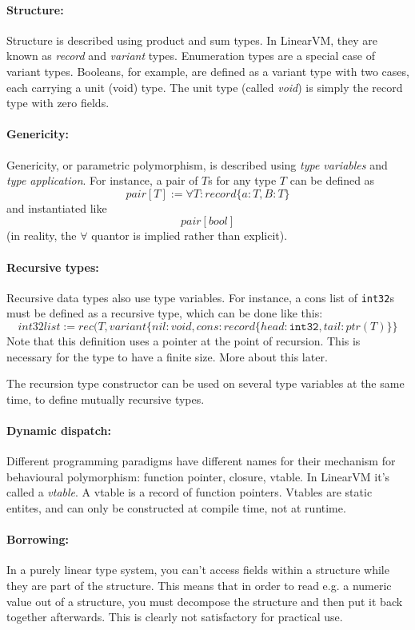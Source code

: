 \documentclass[a4paper]{report}
\begin{document}
\paragraph{Structure:}
Structure is described using product and sum types. In LinearVM, they
are known as \emph{record} and \emph{variant} types.
Enumeration types are a special case of variant types.
Booleans, for example, are defined as a variant type with two cases,
each carrying a unit (void) type.
The unit type (called \emph{void}) is simply the record type with zero fields.

\paragraph{Genericity:}
Genericity, or parametric polymorphism, is described using
\emph{type variables} and \emph{type application}.
For instance, a pair of $T$s for any type $T$ can be defined as
$$pair[T] := \forall T:record\{a:T, B:T\}$$
and instantiated like
$$pair[bool]$$
(in reality, the $\forall$ quantor is implied rather than explicit).

\paragraph{Recursive types:}
Recursive data types also use type variables.
For instance, a cons list of \texttt{int32}s must be defined as a recursive type,
which can be done like this:
$$
int32list := rec(T, variant\{nil:void, cons:record\{head:\mathtt{int32}, tail:ptr(T)\}\}
$$
Note that this definition uses a pointer at the point of
recursion. This is necessary for the type to have a finite size. More
about this later.

The recursion type constructor can be used on several type variables at the same time, to define mutually recursive types.

\paragraph{Dynamic dispatch:}
Different programming paradigms have different names for their mechanism
for behavioural polymorphism: function pointer, closure, vtable.
In LinearVM it's called a \emph{vtable}.
A vtable is a record of function pointers. Vtables are static entites, and
can only be constructed at compile time, not at runtime.

\paragraph{Borrowing:}
In a purely linear type system, you can't access fields within a
structure while they are part of the structure. This means that in
order to read e.g.  a numeric value out of a structure, you must
decompose the structure and then put it back together afterwards.
This is clearly not satisfactory for practical use.
\end{document}
